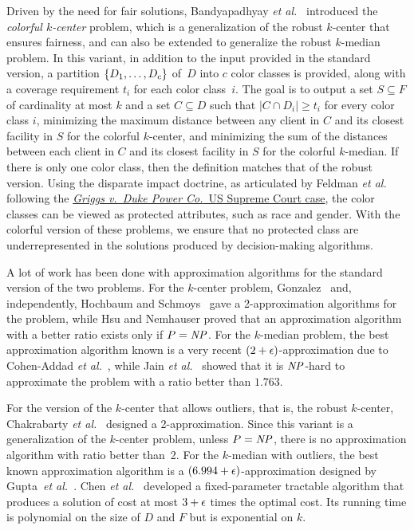 \documentclass[12pt]{article}
\begin{document}
Driven by the need for fair solutions, Bandyapadhyay \emph{et al.}~\cite{BIPV2019} introduced the \emph{colorful $k$-center} problem, which is a generalization of the robust $k$-center that ensures fairness, and can also be extended to generalize the robust $k$-median problem. 
In this variant, in addition to the input provided in the standard version, a partition $\{D_1,\ldots, D_c\}$ of~$D$ into $c$ color classes is provided, along with a coverage requirement $t_i$ for each color class~$i$. 
The goal is to output a set $S \subseteq F$ of cardinality at most $k$ and a set $C \subseteq D$ such that $|C \cap D_i| \geq t_i$ for every color class $i$, minimizing the maximum distance between any client in $C$ and its closest facility in $S$ for the colorful $k$-center, and minimizing the sum of the distances between each client in $C$ and its closest facility in $S$ for the colorful $k$-median.
If there is only one color class, then the definition matches that of the robust version.
Using the disparate impact doctrine, as articulated by Feldman \emph{et al.}~\cite{FSMSV2015} following the \href{https://en.wikipedia.org/wiki/Griggs_v._Duke_Power_Co.}{\emph{Griggs v.\ Duke Power Co.}\ US Supreme Court case}, the color classes can be viewed as protected attributes, such as race and gender. 
With the colorful version of these problems, we ensure that no protected class are underrepresented in the solutions produced by decision-making algorithms.

A lot of work has been done with approximation algorithms for the standard version of the two problems.
For the $k$-center problem, Gonzalez~\cite{G1985} and, independently, Hochbaum and Schmoys~\cite{HS1985} gave a 2-approximation algorithms for the problem, while Hsu and Nemhauser proved that an approximation algorithm with a better ratio exists only if $P=\mathit{NP}$.
For the $k$-median problem, the best approximation algorithm known is a very recent $(2 + \epsilon)$-approximation due to Cohen-Addad \emph{et al.}~\cite{CGLS2025}, while Jain \emph{et al.}~\cite{JMS2002} showed that it is $\mathit{NP}$-hard to approximate the problem with a ratio better than $1.763$.

For the version of the $k$-center that allows outliers, that is, the robust $k$-center, 
Chakrabarty \emph{et al.}~\cite{CGK2020} designed a 2-approximation. 
Since this variant is a generalization of the $k$-center problem, unless $P = \mathit{NP}$, there is no approximation algorithm with ratio better than~2.
For the $k$-median with outliers, the best known approximation algorithm is a $(6.994 + \epsilon)$-approximation designed by Gupta~\emph{et al.}~\cite{GMZ2021}.
Chen \emph{et al.}~\cite{CHXXZ2024} developed a fixed-parameter tractable algorithm that produces a solution of cost at most $3 + \epsilon$ times the optimal cost. Its running time is polynomial on the size of $D$ and $F$ but is exponential on $k$.
\end{document}
